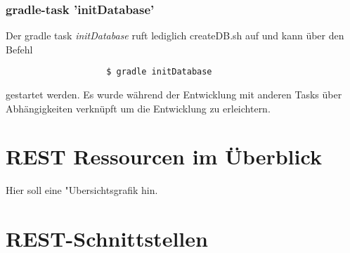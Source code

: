 \documentclass[12pt]{scrartcl}
\begin{document}
			\subsubsection{gradle-task 'initDatabase'}
				Der gradle task \emph{initDatabase} ruft lediglich createDB.sh auf und kann über den Befehl
				\begin{verbatim}
					$ gradle initDatabase
				\end{verbatim}
				gestartet werden. Es wurde während der Entwicklung mit anderen Tasks über Abhängigkeiten verknüpft um die Entwicklung zu erleichtern.
			
	\section{REST Ressourcen im Überblick}
		Hier soll eine "Ubersichtsgrafik hin.
	\section{REST-Schnittstellen} \label{sec:restschnittstellen}
\end{document}
